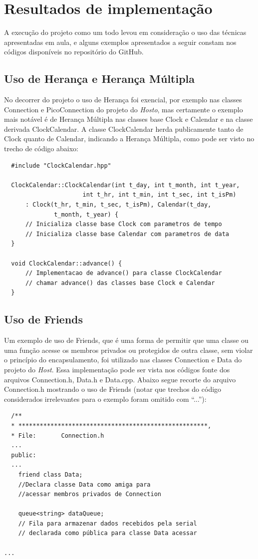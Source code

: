 \documentclass[10pt,twocolumn,letterpaper]{article}
\begin{document}
\section{Resultados de implementação}
A execução do projeto como um todo levou em consideração o uso das técnicas apresentadas em aula, e alguns exemplos apresentados a seguir constam nos códigos disponíveis no repositório do GitHub\cite{src-github}. 

\subsection{Uso de Herança e Herança Múltipla}
No decorrer do projeto o uso de Herança foi exencial, por exemplo nas classes Connection e PicoConnection do projeto do \emph{Hosto}, mas certamente o exemplo mais notável é de Herança Múltipla nas classes base Clock e Calendar e na classe derivada ClockCalendar. A classe ClockCalendar herda publicamente tanto de Clock quanto de Calendar, indicando a Herança Múltipla, como pode ser visto no trecho de código abaixo: 
{\scriptsize
\begin{verbatim}
  #include "ClockCalendar.hpp"

  ClockCalendar::ClockCalendar(int t_day, int t_month, int t_year, 
                      int t_hr, int t_min, int t_sec, int t_isPm)
      : Clock(t_hr, t_min, t_sec, t_isPm), Calendar(t_day, 
              t_month, t_year) {
      // Inicializa classe base Clock com parametros de tempo
      // Inicializa classe base Calendar com parametros de data
  }
  
  void ClockCalendar::advance() {
      // Implementacao de advance() para classe ClockCalendar
      // chamar advance() das classes base Clock e Calendar
  }
\end{verbatim}
}

\subsection{Uso de Friends}
Um exemplo de uso de Friends, que é uma forma de permitir que uma classe ou uma função acesse os membros privados ou protegidos de outra classe, sem violar o princípio do encapsulamento, foi utilizado nas classes Connection e Data do projeto do \emph{Host}. 
Essa implementação pode ser vista nos códigos fonte dos arquivos Connection.h, Data.h e Data.cpp. Abaixo segue recorte do arquivo Connection.h mostrando o uso de Friends (notar que trechos do código considerados irrelevantes para o exemplo foram omitido com ``...''):
{\scriptsize
\begin{verbatim}
  /**
  * *****************************************************,
  * File:       Connection.h
  ...
  public:
  ...
    friend class Data;
    //Declara classe Data como amiga para
    //acessar membros privados de Connection
    
    queue<string> dataQueue; 
    // Fila para armazenar dados recebidos pela serial
    // declarada como pública para classe Data acessar

...  
\end{verbatim}
}
\end{document}
